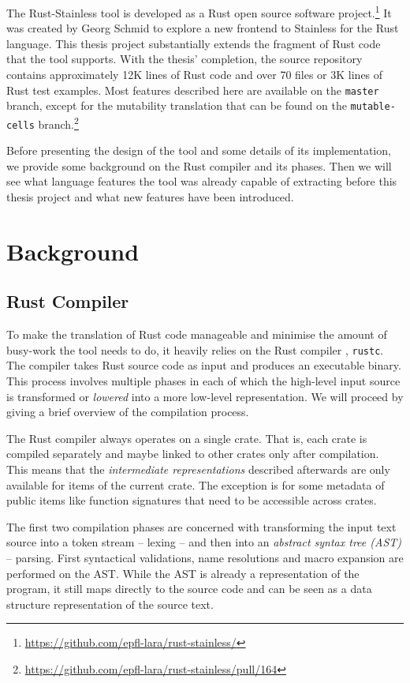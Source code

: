 The Rust-Stainless tool is developed as a Rust open source software
project.\footnote{\url{https://github.com/epfl-lara/rust-stainless/}} It was
created by Georg Schmid to explore a new frontend to Stainless for the Rust
language. This thesis project substantially extends the fragment of Rust code
that the tool supports. With the thesis' completion, the source repository
contains approximately 12K lines of Rust code and over 70 files or 3K lines of
Rust test examples. Most features described here are available on the
\lstinline!master! branch, except for the mutability translation that can be
found on the \lstinline!mutable-cells!
branch.\footnote{\url{https://github.com/epfl-lara/rust-stainless/pull/164}}

Before presenting the design of the tool and some details of its implementation,
we provide some  background on the Rust compiler and its phases. Then we will
see what language features the tool was already capable of extracting before
this thesis project and what new features have been introduced.


\section{Background}

\subsection{Rust Compiler}

To make the translation of Rust code manageable and minimise the amount of
busy-work the tool needs to do, it heavily relies on the Rust compiler
\cite{rustc-guide}, \passthrough{\lstinline!rustc!}. The compiler takes Rust
source code as input and produces an executable binary. This process involves
multiple phases in each of which the high-level input source is transformed or
\emph{lowered} into a more low-level representation. We will proceed by giving a
brief overview of the compilation process.

The Rust compiler always operates on a single crate. That is, each crate is
compiled separately and maybe linked to other crates only after compilation.
This means that the \emph{intermediate representations} described afterwards are
only available for items of the current crate. The exception is for some
metadata of public items like function signatures that need to be accessible
across crates.

The first two compilation phases are concerned with transforming the input text
source into a token stream -- lexing -- and then into an \emph{abstract syntax
tree (AST)} -- parsing. First syntactical validations, name resolutions and
macro expansion are performed on the AST. While the AST is already a
representation of the program, it still maps directly to the source code and can
be seen as a data structure representation of the source text.

